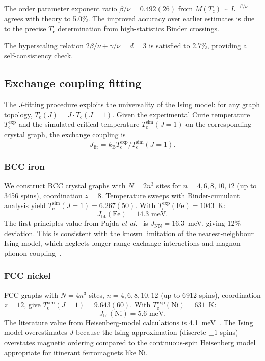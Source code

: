 \documentclass[twocolumn,showpacs,preprintnumbers,amsmath,amssymb,pra,floatfix]{revtex4-2}
\newcommand{\Tc}{T_{\mathrm{c}}}
\newcommand{\kB}{k_{\mathrm{B}}}
\begin{document}
The order parameter exponent ratio $\beta/\nu = 0.492(26)$ from
$M(\Tc) \sim L^{-\beta/\nu}$ agrees with theory to 5.0\%.
The improved accuracy over earlier estimates is due to the precise $\Tc$ determination
from high-statistics Binder crossings.

The hyperscaling relation $2\beta/\nu + \gamma/\nu = d = 3$ is satisfied to 2.7\%,
providing a self-consistency check.

\clearpage
\subsection{Exchange coupling fitting}
\label{sec:jfit}

The $J$-fitting procedure exploits the universality of the Ising model: for any
graph topology, $\Tc(J) = J \cdot \Tc(J=1)$. Given the experimental Curie
temperature $\Tc^{\mathrm{exp}}$ and the simulated critical temperature
$\Tc^{\mathrm{sim}}(J=1)$ on the corresponding crystal graph, the exchange coupling is
\begin{equation}
    J_{\mathrm{fit}} = \kB \Tc^{\mathrm{exp}} / \Tc^{\mathrm{sim}}(J=1).
\end{equation}

\subsubsection{BCC iron}

We construct BCC crystal graphs with $N = 2n^3$ sites for $n = 4, 6, 8, 10, 12$
(up to 3456 spins), coordination $z = 8$. Temperature sweeps with Binder-cumulant
analysis yield $\Tc^{\mathrm{sim}}(J=1) = 6.267(50)$.
With $\Tc^{\mathrm{exp}}(\mathrm{Fe}) = 1043$~K:
\begin{equation}
    J_{\mathrm{fit}}(\mathrm{Fe}) = 14.3 \text{ meV}.
\end{equation}
The first-principles value from Pajda \textit{et al.}~\cite{Pajda2001} is
$J_{\mathrm{NN}} = 16.3$~meV, giving 12\% deviation. This is consistent with the
known limitation of the nearest-neighbour Ising model, which neglects longer-range
exchange interactions and magnon--phonon coupling~\cite{Kormann2010}.

\subsubsection{FCC nickel}

FCC graphs with $N = 4n^3$ sites, $n = 4, 6, 8, 10, 12$ (up to 6912 spins),
coordination $z = 12$, give $\Tc^{\mathrm{sim}}(J=1) = 9.643(60)$.
With $\Tc^{\mathrm{exp}}(\mathrm{Ni}) = 631$~K:
\begin{equation}
    J_{\mathrm{fit}}(\mathrm{Ni}) = 5.6 \text{ meV}.
\end{equation}
The literature value from Heisenberg-model calculations is 4.1~meV~\cite{Pajda2001}.
The Ising model overestimates $J$ because the Ising approximation (discrete $\pm 1$
spins) overstates magnetic ordering compared to the continuous-spin Heisenberg model
appropriate for itinerant ferromagnets like Ni.
\end{document}
